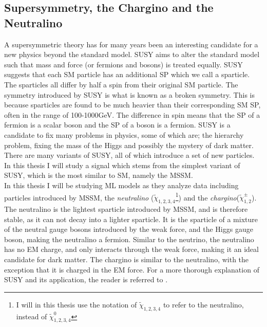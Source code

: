 \subsection{Supersymmetry, the Chargino and the Neutralino}\label{subsec:SS}
A supersymmetric theory has for many years been an interesting candidate for a new physics beyond the standard 
model. \ac{SUSY} aims to alter the standard model such that mass and force (or fermions and bosons) is treated equally. 
\ac{SUSY} suggests that each \ac{SM} particle has an additional \ac{SP} which we call a sparticle. 
The sparticles all differ by half a spin from their original \ac{SM} particle. The symmetry introduced by \ac{SUSY} is what 
is known as a broken symmetry. This is because sparticles are found to be much heavier than their corresponding \ac{SM} \ac{SP}, 
often in the range of 100-1000GeV. The difference in spin means that the \ac{SP} of a fermion is a scalar boson and the \ac{SP} 
of a boson is a fermion. \ac{SUSY} is a candidate to fix many problems in physics, some of which are; the hierarchy problem, fixing 
the mass of the Higgs and possibly the mystery of dark matter. There are many variants of \ac{SUSY}, all of which introduce a set 
of new particles. In this thesis I will study a signal which stems from the simplest variant of \ac{SUSY}, which is the most 
similar to \ac{SM}, namely the \ac{MSSM}. 
\\
In this thesis I will be studying \ac{ML} models as they analyze data including particles introduced by \ac{MSSM}, the \emph{neutralino} ($\tilde{\chi}_{1,2,3,4}$\footnote{I will in this thesis 
use the notation of $\tilde{\chi}_{1,2,3,4}$ to refer to the neutralino, instead of $\tilde{\chi}^0_{1,2,3,4}$}) and 
the \emph{chargino}($\tilde{\chi}^{\pm}_{1,2}$). The neutralino is the lightest sparticle introduced by \ac{MSSM}, and is therefore stable, as it can not decay into a lighter sparticle. 
It is the sparticle of a mixture of the neutral gauge bosons introduced by the weak force, and the Higgs gauge boson, making the neutralino a 
fermion. Similar to the neutrino, the neutralino has no \ac{EM} charge, and only interacts through the weak force, making it an ideal candidate 
for dark matter. The chargino is similar to the neutralino, with the exception that it is charged in the \ac{EM} force. 
For a more thorough explanation of \ac{SUSY} and its application, the reader is referred to \cite{SUSY}. 